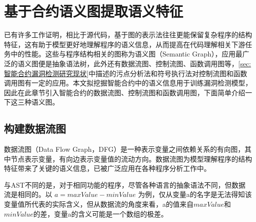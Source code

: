 \section{基于合约语义图提取语义特征}
\label{sec:基于合约语义图提取语义特征}
已有许多工作证明，相比于源代码，基于图的表示法往往更能保留复杂程序的结构特征\cite{allamanis2017learning}，这有助于模型更好地理解程序的语义信息，从而提高在代码理解相关下游任务中的性能。这些与程序结构相关的图称为语义图（Semantic Graph），应用最广泛的语义图便是抽象语法树，此外还有数据流图、控制流图、函数调用图等，\autoref{sec:智能合约漏洞检测研究现状}中描述的污点分析法和符号执行法对控制流图和函数调用图有一定的应用。本文拟挖掘智能合约中的语义信息用于训练漏洞检测模型，因此在此章节引入智能合约的数据流图、控制流图和函数调用图，下面简单介绍一下这三种语义图。
\subsection{构建数据流图}
\label{sec:构建数据流图}
数据流图（Data Flow Graph，DFG）是一种表示变量之间依赖关系的有向图，其中节点表示变量，有向边表示变量值的流动方向。数据流图为模型理解程序的结构特征带来了关键的语义信息，已被广泛应用在各种程序分析工作中\cite{hellendoorn2019global,allamanis2018learning,guo2020graphcodebert}。

与AST不同的是，对于相同功能的程序，尽管各种语言的抽象语法不同，但数据流是相同的。以 $a=maxValue-minValue$ 为例，仅从变量a的名字是无法得知该变量值所代表的实际含义，但从数据流的角度来看，a的值来自$maxValue$和$minValue$的差，变量a的含义可能是一个数组的极差。


